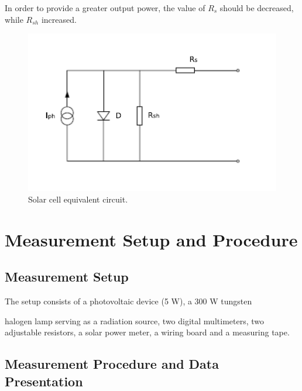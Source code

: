 \documentclass{article}
\begin{document}
{In order to provide a greater output power, the value of $R_s$ should be decreased, while $R_{sh}$ increased.

\begin{figure}[H]
	\centering
	\includegraphics[scale=0.4]{fig3.png}
	\caption{Solar cell equivalent circuit.}
\end{figure}


\section{Measurement Setup and Procedure}

\subsection{Measurement Setup}
The setup consists of a photovoltaic device (5 W), a 300 W tungsten{halogen lamp
serving as a radiation source, two digital multimeters, two adjustable resistors, a solar power meter, a wiring board and a measuring tape.

\subsection{Measurement Procedure and Data Presentation}

}}
\end{document}
